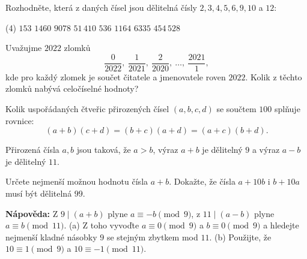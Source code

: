 \documentclass[12pt,a4paper]{article}
\begin{document}
\begin{exercise}
Rozhodněte, která z daných čísel jsou dělitelná čísly $2,3,4,5,6,9,10$ a $12$:
\begin{tasks}(4)
\task $153$
\task $1460$
\task $9078$
\task $51\,410$
\task $536$
\task $1164$
\task $6335$
\task $454\,528$
\end{tasks}
\end{exercise}


\begin{exercise}
Uvažujme $2022$ zlomků
\[
\frac{0}{2022},\ \frac{1}{2021},\ \frac{2}{2020},\ \dots,\ \frac{2021}{1},
\]
kde pro každý zlomek je součet čitatele a jmenovatele roven $2022$.  
Kolik z těchto zlomků nabývá celočíselné hodnoty?
\end{exercise}


\begin{exercise}
Kolik uspořádaných čtveřic přirozených čísel $(a,b,c,d)$ se součtem $100$ splňuje rovnice:
\[
(a +b)(c +d) = (b+c)(a+d) = (a+c)(b+d).
\]
\end{exercise}



\newpage


\setcounter{section}{2}

\begin{exercise}
Přirozená čísla $a,b$ jsou taková, že $a>b$, výraz $a+b$ je dělitelný $9$ a výraz $a-b$ je dělitelný $11$.
\begin{tasks}
\task Určete nejmenší možnou hodnotu čísla $a+b$.
\task Dokažte, že čísla $a+10b$ i $b+10a$ musí být dělitelná $99$.
\end{tasks}
\end{exercise}

\begin{notebox}
\textbf{Nápověda:} Z $9\mid (a+b)$ plyne $a\equiv -b\pmod 9$, z $11\mid(a-b)$ plyne $a\equiv b\pmod{11}$.  
(a) Z toho vyvoďte $a\equiv 0\pmod 9$ a $b\equiv 0\pmod 9$ a hledejte nejmenší kladné násobky $9$ se stejným zbytkem mod $11$.  
(b) Použijte, že $10\equiv 1\pmod 9$ a $10\equiv -1\pmod{11}$.
\end{notebox}
\end{document}
